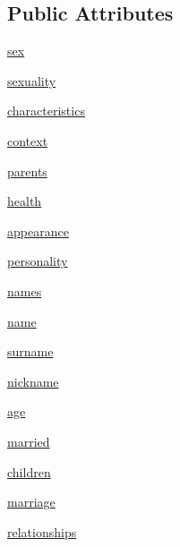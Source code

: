 \subsection*{Public Attributes}
\begin{DoxyCompactItemize}
\item 
\hyperlink{classclasses_1_1person_1_1Person_a8e0e00739ec694ce3c0a05370c99c6fb}{sex}
\item 
\hyperlink{classclasses_1_1person_1_1Person_a8701800ff271b21eebb78a5ea472b322}{sexuality}
\item 
\hyperlink{classclasses_1_1person_1_1Person_a6009857472d055ca9674eb5516d6929c}{characteristics}
\item 
\hyperlink{classclasses_1_1person_1_1Person_a8b821b66c4200dcb6f9975d7f6f9612a}{context}
\item 
\hyperlink{classclasses_1_1person_1_1Person_a8598294e27c3c5cb008e84f7ef0be7fd}{parents}
\item 
\hyperlink{classclasses_1_1person_1_1Person_a8aa5184e6bcffe3ba82ee0dd3f7d3775}{health}
\item 
\hyperlink{classclasses_1_1person_1_1Person_a91e256938d4897e04285cb05215d4b8a}{appearance}
\item 
\hyperlink{classclasses_1_1person_1_1Person_a4a31f250cfc5c10d6437abceea47cb62}{personality}
\item 
\hyperlink{classclasses_1_1person_1_1Person_a5bafaecbd95e9e581f1b5ab67b9b001f}{names}
\item 
\hyperlink{classclasses_1_1person_1_1Person_ab58ca3b219d029372d79888a80680ec3}{name}
\item 
\hyperlink{classclasses_1_1person_1_1Person_a0c30879d941c9d4fa33ee4ce8244d9e8}{surname}
\item 
\hyperlink{classclasses_1_1person_1_1Person_ad0ed70da97b6a6baae2c47765c6aa12b}{nickname}
\item 
\hyperlink{classclasses_1_1person_1_1Person_af911ef17491efdfc9122b6786d8f79fe}{age}
\item 
\hyperlink{classclasses_1_1person_1_1Person_aa0a4bdc8f237587f8d363741bca6fdfa}{married}
\item 
\hyperlink{classclasses_1_1person_1_1Person_abdf72592aaf7225eba353c6020266a09}{children}
\item 
\hyperlink{classclasses_1_1person_1_1Person_a581585df20d9dd001ea40afa260020ee}{marriage}
\item 
\hyperlink{classclasses_1_1person_1_1Person_a7ba124276a53f33e45d5dbfc1689e1eb}{relationships}
\item 

\end{DoxyCompactItemize}
